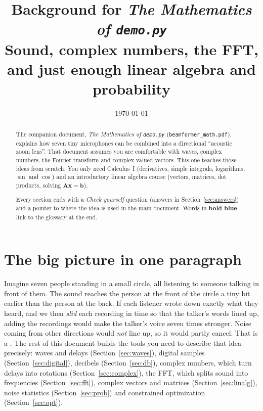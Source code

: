 \documentclass[11pt]{article}
\title{\textbf{Background for \emph{The Mathematics of \texttt{demo.py}}}\\[4pt]
\large Sound, complex numbers, the FFT, and just enough linear algebra and probability}
\date{\today}
\begin{document}
\maketitle

\begin{abstract}
\noindent
The companion document, \emph{The Mathematics of \texttt{demo.py}} (\texttt{beamformer\_math.pdf}),
explains how seven tiny microphones can be combined into a directional ``acoustic zoom lens''.
That document assumes you are comfortable with waves, complex numbers, the Fourier transform and
complex-valued vectors. This one teaches those ideas from scratch. You only need Calculus~I
(derivatives, simple integrals, logarithms, $\sin$ and $\cos$) and an introductory linear algebra
course (vectors, matrices, dot products, solving $\mathbf A\mathbf x=\mathbf b$).

Every section ends with a \emph{Check yourself} question (answers in Section~\ref{sec:answers})
and a pointer to where the idea is used in the main document. Words in \textbf{bold blue} link to
the glossary at the end.
\end{abstract}

\tableofcontents

\section*{The big picture in one paragraph}

Imagine seven people standing in a small circle, all listening to someone talking in front of
them. The sound reaches the person at the front of the circle a tiny bit earlier than the person
at the back. If each listener wrote down exactly what they heard, and we then \emph{slid} each
recording in time so that the talker's words lined up, adding the recordings would make the
talker's voice seven times stronger. Noise coming from other directions would \emph{not} line
up, so it would partly cancel. That is a . The rest of this
document builds the tools you need to describe that idea precisely: waves and delays
(Section~\ref{sec:waves}), digital samples (Section~\ref{sec:digital}), decibels
(Section~\ref{sec:db}), complex numbers, which turn delays into rotations
(Section~\ref{sec:complex}), the FFT, which splits sound into frequencies
(Section~\ref{sec:fft}), complex vectors and matrices (Section~\ref{sec:linalg}), noise
statistics (Section~\ref{sec:prob}) and constrained optimization (Section~\ref{sec:opt}).
\end{document}
